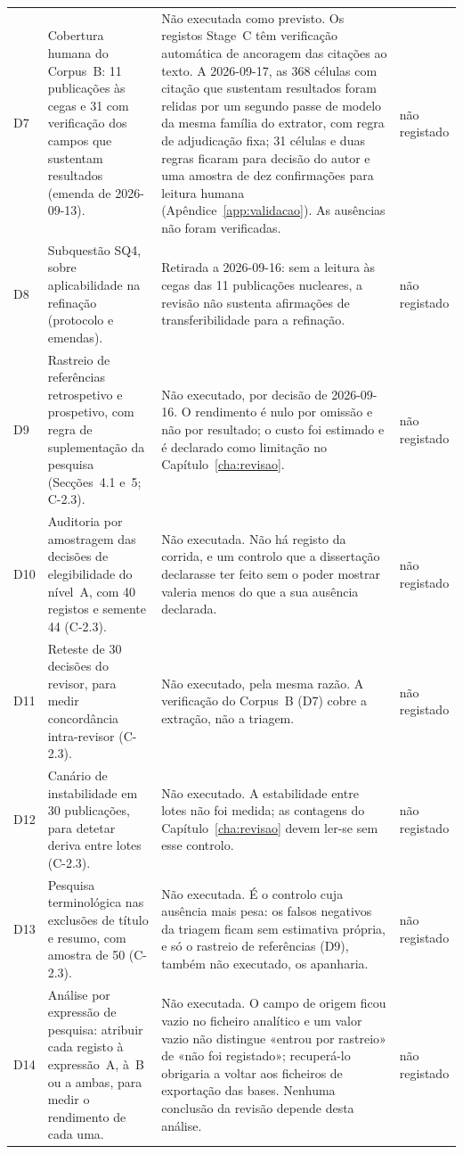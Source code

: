 {\begin{xltabular}{\linewidth}{@{}l>{\raggedright\arraybackslash}X>{\raggedright\arraybackslash}Xl@{}}
D7 & Cobertura humana do Corpus~B: 11 publicações às cegas e 31 com verificação dos campos que sustentam resultados (emenda de 2026-09-13). & Não executada como previsto. Os registos Stage~C têm verificação automática de ancoragem das citações ao texto. A 2026-09-17, as 368 células com citação que sustentam resultados foram relidas por um segundo passe de modelo da mesma família do extrator, com regra de adjudicação fixa; 31 células e duas regras ficaram para decisão do autor e uma amostra de dez confirmações para leitura humana (Apêndice~\ref{app:validacao}). As ausências não foram verificadas. & não registado \\
D8 & Subquestão SQ4, sobre aplicabilidade na refinação (protocolo e emendas). & Retirada a 2026-09-16: sem a leitura às cegas das 11 publicações nucleares, a revisão não sustenta afirmações de transferibilidade para a refinação. & não registado \\
D9 & Rastreio de referências retrospetivo e prospetivo, com regra de suplementação da pesquisa (Secções~4.1 e~5; C-2.3). & Não executado, por decisão de 2026-09-16. O rendimento é nulo por omissão e não por resultado; o custo foi estimado e é declarado como limitação no Capítulo~\ref{cha:revisao}. & não registado \\
D10 & Auditoria por amostragem das decisões de elegibilidade do nível~A, com 40 registos e semente 44 (C-2.3). & Não executada. Não há registo da corrida, e um controlo que a dissertação declarasse ter feito sem o poder mostrar valeria menos do que a sua ausência declarada. & não registado \\
D11 & Reteste de 30 decisões do revisor, para medir concordância intra-revisor (C-2.3). & Não executado, pela mesma razão. A verificação do Corpus~B (D7) cobre a extração, não a triagem. & não registado \\
D12 & Canário de instabilidade em 30 publicações, para detetar deriva entre lotes (C-2.3). & Não executado. A estabilidade entre lotes não foi medida; as contagens do Capítulo~\ref{cha:revisao} devem ler-se sem esse controlo. & não registado \\
D13 & Pesquisa terminológica nas exclusões de título e resumo, com amostra de 50 (C-2.3). & Não executada. É o controlo cuja ausência mais pesa: os falsos negativos da triagem ficam sem estimativa própria, e só o rastreio de referências (D9), também não executado, os apanharia. & não registado \\
D14 & Análise por expressão de pesquisa: atribuir cada registo à expressão~A, à~B ou a ambas, para medir o rendimento de cada uma. & Não executada. O campo de origem ficou vazio no ficheiro analítico e um valor vazio não distingue «entrou por rastreio» de «não foi registado»; recuperá-lo obrigaria a voltar aos ficheiros de exportação das bases. Nenhuma conclusão da revisão depende desta análise. & não registado \\
\end{xltabular}
}

